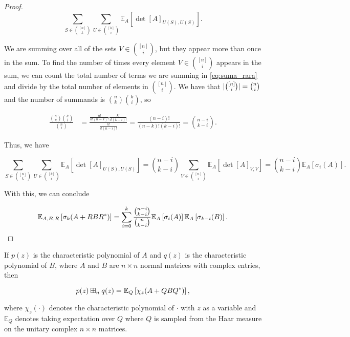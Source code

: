 \begin{proof}
    \begin{equation} \label{eq:suma_rara} \sum_{S\in\binom{[n]}{k}} \sum_{U\in \binom{[k]}{i}}  \mathbb E_A\left[\det[A]_{U(S),U(S)} \right]. \end{equation}

    We are summing over all of the sets $V \in \binom{[n]}{i}$, but they appear more than once in the sum. To find the number of times every element $V\in \binom{[n]}{i}$ appears in the sum, we can count the total number of terms we are summing in \eqref{eq:suma_rara} and divide by the total number of elements in $\binom{[n]}{i}$. We have that $\lvert \binom{[n]}i \rvert = \binom{n}{i}$ and the number of summands is $\binom{n}{k}\binom{k}{i}$, so

    \begin{align*}
        \frac{\binom{n}{k}\binom{k}{i}}{\binom{n}{i}} &= \frac{\frac{n!}{k!(n-k)!}\frac{k!}{i!(k-i)!}}{\frac{n!}{i!(n-i)!}} = \frac{(n-i)!}{(n-k)!(k-i)!} = \binom{n-i}{k-i}.
    \end{align*}

    Thus, we have

    \begin{equation*}
        \sum_{S\in\binom{[n]}{k}} \sum_{U\in \binom{[k]}{i}}  \mathbb E_A\left[ \det[A]_{U(S),U(S)} \right] = \binom{n-i}{k-i} \sum_{V\in \binom{[n]}{i}} \mathbb E_A\left[ \det[A]_{V,V} \right] = \binom{n-i}{k-i}\mathbb E_A\left[\sigma_{i}(A)\right].
    \end{equation*}

    With this, we can conclude

    \begin{equation*}
        \mathbb E_{A,B,R}\left[ \sigma_k(A + RBR^*) \right] =  \sum_{i=0}^k \frac{\binom{n-i}{k-i}}{\binom{n}{k-i}}\mathbb E_{A} \left[\sigma_i(A)\right] \mathbb E_{A}\left[\sigma_{k-i}(B)\right].
    \end{equation*}

\end{proof}


\begin{theorem} \label{thm:symmad}
    If $p(z)$ is the characteristic polynomial of $A$ and $q(z)$ is the characteristic polynomial of $B$, where $A$ and $B$ are $n\times n$ normal matrices with complex entries, then 

    \begin{equation*}
        p(z) \boxplus_n q(z) = \mathbb E_Q\left[\chi_z(A + Q B Q^*)\right],
    \end{equation*}

    \noindent where $\chi_z(\cdot)$ denotes the characteristic polynomial of $\cdot$ with $z$ as a variable and $\mathbb E_Q$ denotes taking expectation over $Q$ where $Q$ is sampled from the Haar measure on the unitary complex $n\times n$ matrices.
\end{theorem}

